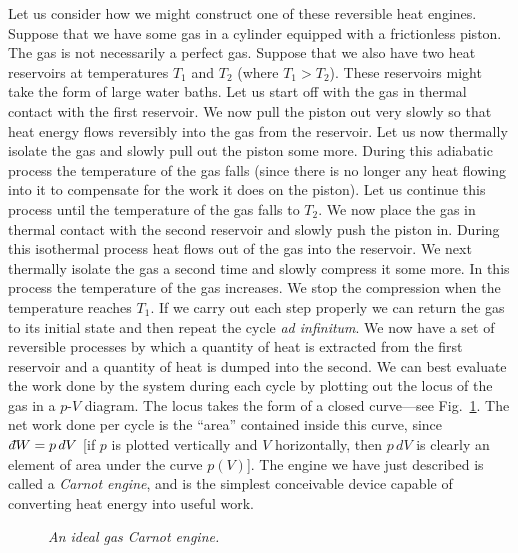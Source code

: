 Let us consider how we might construct one of these reversible heat engines. 
Suppose that we have some gas in a cylinder equipped with a frictionless piston.
The gas is not necessarily a perfect gas. Suppose that we also have two heat
reservoirs at  temperatures $T_1$ and $T_2$ (where $T_1 > T_2$). These
reservoirs might take the form of large water baths. 
Let us start off with the
gas in thermal contact with the first reservoir. We now pull the piston out
very slowly so that heat energy flows reversibly into the gas from the
reservoir. Let us now thermally isolate  the gas and slowly pull out
the piston some more. During this adiabatic process the temperature of the
gas  falls (since there is no longer any heat flowing into it  to
compensate for the work it does on the piston). Let us continue this process 
until the temperature  of the gas falls to $T_2$. We now place the
gas in thermal contact with the second reservoir and slowly push the piston
in. During this isothermal 
process heat  flows out of the gas into the reservoir. We next
thermally isolate the gas a second time and slowly compress it some more. In this
process the  temperature of the gas increases. We stop the compression when the temperature
reaches $T_1$. If we carry out each step properly we can return the gas to
its initial state and then repeat the cycle {\em ad infinitum}.
We now have  a set of reversible processes by which a quantity
of heat is extracted from the
first reservoir and a quantity of heat is dumped into the second. We can best
evaluate
the work done by the system during each cycle
by plotting out the locus of the gas in a $p$-$V$
diagram. The locus takes the form of a closed curve---see Fig.~\ref{fcan}.
The net work done per cycle is the ``area'' contained inside this curve, since
$\,\dbar W = p \,dV$ [if $p$ is plotted vertically and $V$ horizontally,
then $p \,dV$ is clearly an element of area under the curve $p(V)$].
 The engine we have
just described is called a {\em Carnot engine}, and is the simplest conceivable
device capable of converting heat energy into useful work.

\begin{figure}
\epsfysize=3in
\centerline{}
\caption{\em An ideal gas Carnot engine.}\label{fcan}
\end{figure}

